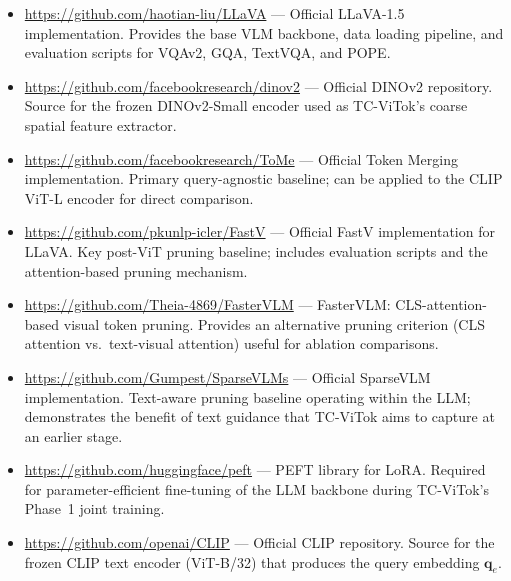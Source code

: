 \documentclass[11pt,twocolumn]{article}
\begin{document}
\begin{itemize}[leftmargin=*, itemsep=2pt]

    \item \url{https://github.com/haotian-liu/LLaVA} ---
          Official LLaVA-1.5 implementation. Provides the base VLM backbone, data loading pipeline, and evaluation scripts for VQAv2, GQA, TextVQA, and POPE.

    \item \url{https://github.com/facebookresearch/dinov2} ---
          Official DINOv2 repository. Source for the frozen DINOv2-Small encoder used as TC-ViTok's coarse spatial feature extractor.

    \item \url{https://github.com/facebookresearch/ToMe} ---
          Official Token Merging implementation. Primary query-agnostic baseline; can be applied to the CLIP ViT-L encoder for direct comparison.

    \item \url{https://github.com/pkunlp-icler/FastV} ---
          Official FastV implementation for LLaVA. Key post-ViT pruning baseline; includes evaluation scripts and the attention-based pruning mechanism.

    \item \url{https://github.com/Theia-4869/FasterVLM} ---
          FasterVLM: CLS-attention-based visual token pruning. Provides an alternative pruning criterion (CLS attention vs.\ text-visual attention) useful for ablation comparisons.

    \item \url{https://github.com/Gumpest/SparseVLMs} ---
          Official SparseVLM implementation. Text-aware pruning baseline operating within the LLM; demonstrates the benefit of text guidance that TC-ViTok aims to capture at an earlier stage.

    \item \url{https://github.com/huggingface/peft} ---
          PEFT library for LoRA. Required for parameter-efficient fine-tuning of the LLM backbone during TC-ViTok's Phase~1 joint training.

    \item \url{https://github.com/openai/CLIP} ---
          Official CLIP repository. Source for the frozen CLIP text encoder (ViT-B/32) that produces the query embedding $\mathbf{q}_e$.

\end{itemize}
\end{document}
